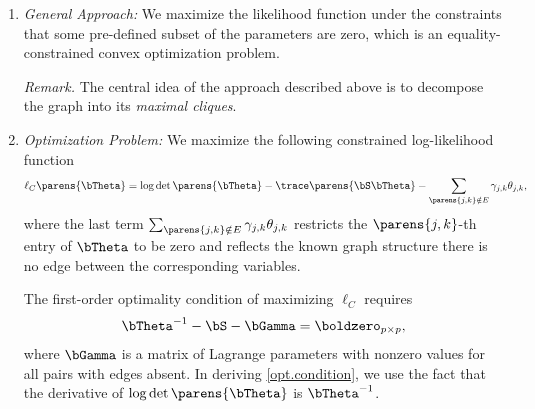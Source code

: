 \documentclass[12pt]{article}
\begin{document}
\begin{enumerate}[label=\textbf{\arabic*.}]
\begin{enumerate}
		\item \textit{General Approach:} We maximize the likelihood function under the constraints that some pre-defined subset of the parameters are zero, which is an equality-constrained convex optimization problem. 
		
		\textit{Remark.} The central idea of the approach described above is to decompose the graph into its \textit{maximal cliques}. 
		
		\item \textit{Optimization Problem:} We maximize the following constrained log-likelihood function 
		\begin{align}\label{constrained.loglik}
			\ell_C \parens{\bTheta} = \log \det \parens{\bTheta} - \trace \parens{\bS \bTheta} - \sum_{\parens{j, k} \notin E} \gamma_{j,k}\theta_{j,k}, 
		\end{align}
		where the last term $\sum_{\parens{j, k} \notin E} \gamma_{j, k}\theta_{j,k}$ restricts the $\parens{j, k}$-th entry of $\bTheta$ to be zero and reflects the known graph structure there is no edge between the corresponding variables. 
		
		The first-order optimality condition of maximizing $\ell_C$ requires 
		\begin{align}\label{opt.condition}
			\bTheta^{-1} - \bS - \bGamma = \boldzero_{p \times p}, 
		\end{align}
		where $\bGamma$ is a matrix of Lagrange parameters with nonzero values for all pairs with edges absent. In deriving \eqref{opt.condition}, we use the fact that the derivative of $\log \det \parens{\bTheta}$ is $\bTheta^{-1}$. 
		

\end{enumerate}
\end{enumerate}
\end{document}
